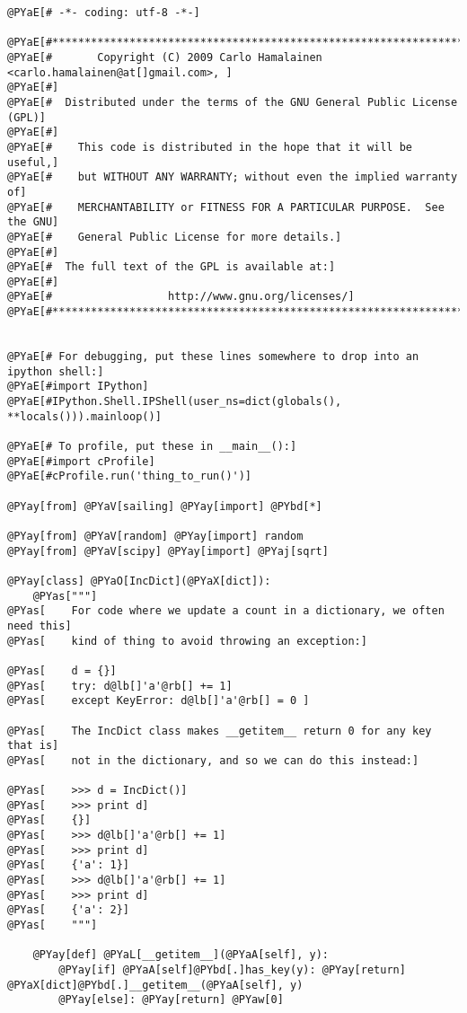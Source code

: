 \begin{Verbatim}[commandchars=@\[\]]
@PYaE[# -*- coding: utf-8 -*-]

@PYaE[#*****************************************************************************]
@PYaE[#       Copyright (C) 2009 Carlo Hamalainen <carlo.hamalainen@at[]gmail.com>, ]
@PYaE[#]
@PYaE[#  Distributed under the terms of the GNU General Public License (GPL)]
@PYaE[#]
@PYaE[#    This code is distributed in the hope that it will be useful,]
@PYaE[#    but WITHOUT ANY WARRANTY; without even the implied warranty of]
@PYaE[#    MERCHANTABILITY or FITNESS FOR A PARTICULAR PURPOSE.  See the GNU]
@PYaE[#    General Public License for more details.]
@PYaE[#]
@PYaE[#  The full text of the GPL is available at:]
@PYaE[#]
@PYaE[#                  http://www.gnu.org/licenses/]
@PYaE[#*****************************************************************************]


@PYaE[# For debugging, put these lines somewhere to drop into an ipython shell:]
@PYaE[#import IPython]
@PYaE[#IPython.Shell.IPShell(user_ns=dict(globals(), **locals())).mainloop()]

@PYaE[# To profile, put these in __main__():]
@PYaE[#import cProfile]
@PYaE[#cProfile.run('thing_to_run()')]

@PYay[from] @PYaV[sailing] @PYay[import] @PYbd[*]

@PYay[from] @PYaV[random] @PYay[import] random
@PYay[from] @PYaV[scipy] @PYay[import] @PYaj[sqrt]

@PYay[class] @PYaO[IncDict](@PYaX[dict]):
    @PYas["""]
@PYas[    For code where we update a count in a dictionary, we often need this]
@PYas[    kind of thing to avoid throwing an exception:]

@PYas[    d = {}]
@PYas[    try: d@lb[]'a'@rb[] += 1]
@PYas[    except KeyError: d@lb[]'a'@rb[] = 0 ]

@PYas[    The IncDict class makes __getitem__ return 0 for any key that is]
@PYas[    not in the dictionary, and so we can do this instead:]

@PYas[    >>> d = IncDict()]
@PYas[    >>> print d]
@PYas[    {}]
@PYas[    >>> d@lb[]'a'@rb[] += 1]
@PYas[    >>> print d]
@PYas[    {'a': 1}]
@PYas[    >>> d@lb[]'a'@rb[] += 1]
@PYas[    >>> print d]
@PYas[    {'a': 2}]
@PYas[    """]

    @PYay[def] @PYaL[__getitem__](@PYaA[self], y):
        @PYay[if] @PYaA[self]@PYbd[.]has_key(y): @PYay[return] @PYaX[dict]@PYbd[.]__getitem__(@PYaA[self], y)
        @PYay[else]: @PYay[return] @PYaw[0]


\end{Verbatim}
